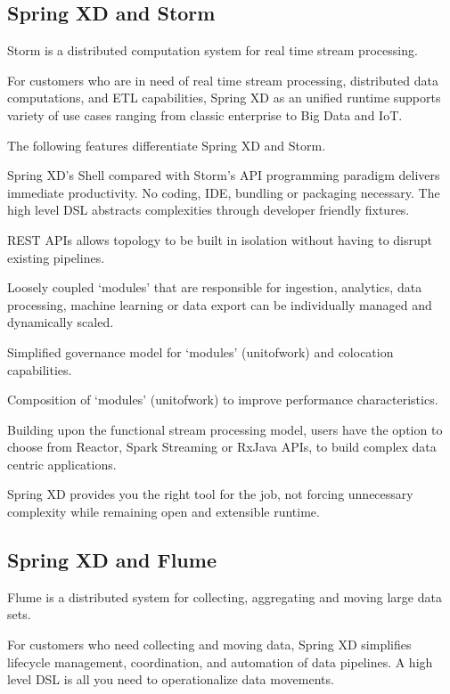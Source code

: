 \subsection{Spring XD and Storm}
Storm is a distributed computation system for real time stream processing.

For customers who are in need of real time stream processing, distributed data computations, and ETL capabilities, Spring XD as an unified runtime supports variety of use cases ranging from classic enterprise to Big Data and IoT. 

The following features differentiate Spring XD and Storm.

\begin{itemize*}
\item Spring XD's Shell compared with Storm's API programming paradigm delivers immediate productivity. No coding, IDE, bundling or packaging necessary. The high level DSL abstracts complexities through developer friendly fixtures.
\item REST APIs allows topology to be built in isolation without having to disrupt existing pipelines.
\item Loosely coupled `modules' that are responsible for ingestion, analytics, data processing, machine learning or data export can be individually managed and dynamically scaled.
\item Simplified governance model for `modules' (unit\-of\-work) and colocation capabilities.
\item Composition of `modules' (unit\-of\-work) to improve performance characteristics. 
\item Building upon the functional stream processing model, users have the option to choose from Reactor, Spark Streaming or RxJava APIs, to build complex data centric applications.
\end{itemize*}

Spring XD provides you the right tool for the job, not forcing unnecessary complexity while remaining open and extensible runtime.

\subsection{Spring XD and Flume}
Flume is a distributed system for collecting, aggregating and moving large data sets. 

For customers who need collecting and moving data, Spring XD simplifies lifecycle management, coordination, and automation of data pipelines. A high level DSL is all you need to operationalize data movements. 

